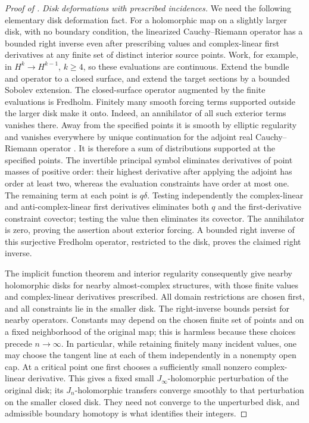 \begin{proof}[Proof of ]
\smallskip
\noindent\emph{Disk deformations with prescribed incidences.}
We need the following elementary disk deformation fact.  For a
holomorphic map on a slightly larger disk, with no boundary
condition, the linearized Cauchy--Riemann operator has a bounded
right inverse even after prescribing values and complex-linear
first derivatives at any finite set of distinct interior source
points.  Work, for example, in \(H^k\to H^{k-1}\), \(k\ge4\),
so these evaluations are continuous.  Extend the bundle and
operator to a closed surface, and extend the target sections by a
bounded Sobolev extension.  The closed-surface operator augmented
by the finite evaluations is Fredholm.  Finitely many smooth
forcing terms supported outside the larger disk make it onto.
Indeed, an annihilator of all such exterior terms vanishes there.
Away from the specified points it is smooth by elliptic regularity
and vanishes everywhere by unique continuation for the adjoint
real Cauchy--Riemann operator
\cite[Theorem~2.78 and Proposition~3.12]{Wendl2014Lectures}.
It is therefore a sum of distributions supported at the specified
points.  The invertible principal symbol eliminates derivatives of
point masses of positive order: their highest derivative after
applying the adjoint has order at least two, whereas the evaluation
constraints have order at most one.  The remaining term at each
point is \(q\delta\).  Testing independently the complex-linear
and anti-complex-linear first derivatives eliminates both \(q\)
and the first-derivative constraint covector; testing the value
then eliminates its covector.  The annihilator is zero, proving
the assertion about exterior forcing.  A bounded right inverse of
this surjective Fredholm operator, restricted to the disk, proves
the claimed right inverse.

The implicit function theorem and interior regularity consequently
give nearby holomorphic disks for nearby almost-complex structures,
with those finite values and complex-linear derivatives prescribed.
All domain restrictions are chosen first, and all constraints lie
in the smaller disk.  The right-inverse bounds persist for nearby
operators.  Constants may depend on the chosen finite set of
points and on a fixed neighborhood of the original map; this is
harmless because these choices precede \(n\to\infty\).  In
particular, while retaining finitely many incident values, one may
choose the tangent line at each of them independently in a nonempty
open cap.  At a critical point one first chooses a sufficiently
small nonzero complex-linear derivative.  This gives a fixed small
\(J_\infty\)-holomorphic perturbation of the original disk;
its \(J_n\)-holomorphic transfers converge smoothly to that
perturbation on the smaller closed disk.  They need not converge
to the unperturbed disk, and admissible boundary homotopy is what
identifies their integers.


\end{proof}
